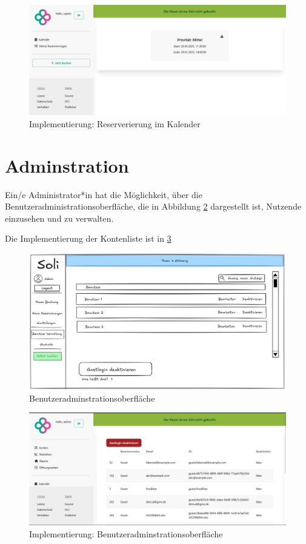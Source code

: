 \begin{figure}
    \centering
    \includegraphics[width=\textwidth]{figures/impl-views/view_booking_light}
    \caption{Implementierung: Reserverierung im Kalender}
    \label{fig:impl-calendarviewbooking}
\end{figure}
\clearpage


\section{Adminstration}
Ein/e Administrator*in hat die Möglichkeit, über die Benutzeradministrationsoberfläche, die in Abbildung \ref{fig:adminuser} dargestellt ist, Nutzende einzusehen und zu verwalten.

Die Implementierung der Kontenliste ist in \ref{fig:impl-adminuser}

\begin{figure}[ht]
    \centering
    \includegraphics[width=\textwidth]{figures/mockup/admin_users}
    \caption{Benutzeradminstrationsoberfläche}
    \label{fig:adminuser}
\end{figure}
\begin{figure}[ht]
    \centering
    \includegraphics[width=\textwidth]{figures/impl-views/user_list_light}
    \caption{Implementierung: Benutzeradminstrationsoberfläche}
    \label{fig:impl-adminuser}
\end{figure}
\clearpage

